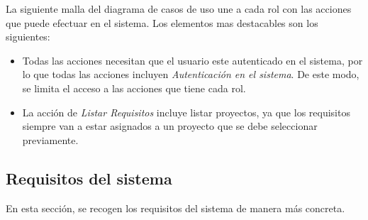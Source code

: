 \documentclass[a4paper, spanish]{article}
\begin{document}
La siguiente malla del diagrama de casos de uso une a cada rol con las acciones
que puede efectuar en el sistema. Los elementos mas destacables son los siguientes:
\begin{itemize}
  \item Todas las acciones necesitan que el usuario este autenticado en el sistema, por lo que todas las acciones incluyen \textit{Autenticación en el sistema}.
  De este modo, se limita el acceso a las acciones que tiene cada rol.
  \item La acción de \textit{Listar Requisitos} incluye listar proyectos, ya que los requisitos siempre van a estar asignados a un proyecto que se debe seleccionar previamente.
\end{itemize}

\subsection{Requisitos del sistema}
En esta sección, se recogen los requisitos del sistema de manera más concreta.

\newcommand{\CasoDeUso}[1]{%
\pgfqkeys{/ings/analisis}{%
  define/.style = { ##1/.initial = \textcolor{red}{(Unset {##1})}, },
  define/.list = {%
    identificador,autor,
    fecha,actores involucrados,resumen,precondiciones,
    postcondiciones,secuencia,caminos alternativos,
    clases involucradas,
  },
  #1,
  /utils/exec = {%
    \noindent\begin{tikzpicture}[%
        my node/.style = {%
          text width=\textwidth,
          on chain,
          minimum height = 0.5cm,
          draw = black,
        },
        start chain = going below,
        node distance = -0.5pt,
      ]
      \node[my node, fill=black!10, align=center] (id)       {\pgfkeysvalueof{/ings/analisis/identificador}};
      \node[my node] (autor)    {\textbf{Autor}: \pgfkeysvalueof{/ings/analisis/autor}};
      \node[my node] (fecha)    {\textbf{Fecha}: \pgfkeysvalueof{/ings/analisis/fecha}};
      \node[my node] (actores)  {\textbf{Actores involucrados}: \pgfkeysvalueof{/ings/analisis/actores involucrados}};
      \node[my node] (clases) {\textbf{Clases involucradas}: \pgfkeysvalueof{/ings/analisis/clases involucradas}};
      \node[my node, align=justify] (resumen) {\pgfkeysvalueof{/ings/analisis/resumen}};
      \node[my node] (precondiciones) {\textbf{Precondiciones}: \pgfkeysvalueof{/ings/analisis/precondiciones}};
      \node[my node] (postcondiciones) {\textbf{Postcondiciones}: \pgfkeysvalueof{/ings/analisis/postcondiciones}};
      \node[my node] (secuencia) {\pgfkeysvalueof{/ings/analisis/secuencia}};
    \end{tikzpicture}
  }
}}
\end{document}
